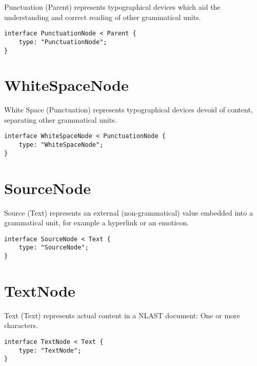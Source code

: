 Punctuation (Parent) represents typographical devices which aid the
understanding and correct reading of other grammatical units.

\begin{lstlisting}[language=IDL]
interface PunctuationNode < Parent {
    type: "PunctuationNode";
}
\end{lstlisting}

\section*{WhiteSpaceNode}\label{whitespacenode}

White Space (Punctuation) represents typographical devices devoid of
content, separating other grammatical units.

\begin{lstlisting}[language=IDL]
interface WhiteSpaceNode < PunctuationNode {
    type: "WhiteSpaceNode";
}
\end{lstlisting}

\section*{SourceNode}\label{sourcenode}

Source (Text) represents an external (non-grammatical) value embedded
into a grammatical unit, for example a hyperlink or an emoticon.

\begin{lstlisting}[language=IDL]
interface SourceNode < Text {
    type: "SourceNode";
}
\end{lstlisting}

\section*{TextNode}\label{textnode}

Text (Text) represents actual content in a NLAST document: One or more
characters.

\begin{lstlisting}[language=IDL]
interface TextNode < Text {
    type: "TextNode";
}
\end{lstlisting}
